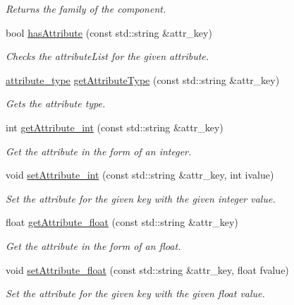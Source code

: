 \begin{DoxyCompactItemize}
\begin{DoxyCompactList}\small\item\em Returns the family of the component. \end{DoxyCompactList}\item 
bool \hyperlink{class_abstract_component_ad4b70f22cedf55ce2d7b58c87ccbfcab}{has\-Attribute} (const std\-::string \&attr\-\_\-key)
\begin{DoxyCompactList}\small\item\em Checks the attribute\-List for the given attribute. \end{DoxyCompactList}\item 
\hyperlink{_abstract_component_8h_a7d090069888e2837cee65351f2e86d73}{attribute\-\_\-type} \hyperlink{class_abstract_component_a6debeb112e68311573bf641815e1e111}{get\-Attribute\-Type} (const std\-::string \&attr\-\_\-key)
\begin{DoxyCompactList}\small\item\em Gets the attribute type. \end{DoxyCompactList}\item 
int \hyperlink{class_abstract_component_a16ac644f742683149b78d01b787eb3bd}{get\-Attribute\-\_\-int} (const std\-::string \&attr\-\_\-key)
\begin{DoxyCompactList}\small\item\em Get the attribute in the form of an integer. \end{DoxyCompactList}\item 
void \hyperlink{class_abstract_component_aca84c14d196467bda6aff90521b1ae7f}{set\-Attribute\-\_\-int} (const std\-::string \&attr\-\_\-key, int ivalue)
\begin{DoxyCompactList}\small\item\em Set the attribute for the given key with the given integer value. \end{DoxyCompactList}\item 
float \hyperlink{class_abstract_component_a890ca92530f6b39afe8c261ce27709c7}{get\-Attribute\-\_\-float} (const std\-::string \&attr\-\_\-key)
\begin{DoxyCompactList}\small\item\em Get the attribute in the form of an float. \end{DoxyCompactList}\item 
void \hyperlink{class_abstract_component_aadaf9dfbb371db5fb21f9c7cf2cbea98}{set\-Attribute\-\_\-float} (const std\-::string \&attr\-\_\-key, float fvalue)
\begin{DoxyCompactList}\small\item\em Set the attribute for the given key with the given float value. \end{DoxyCompactList}\item 

\end{DoxyCompactItemize}
